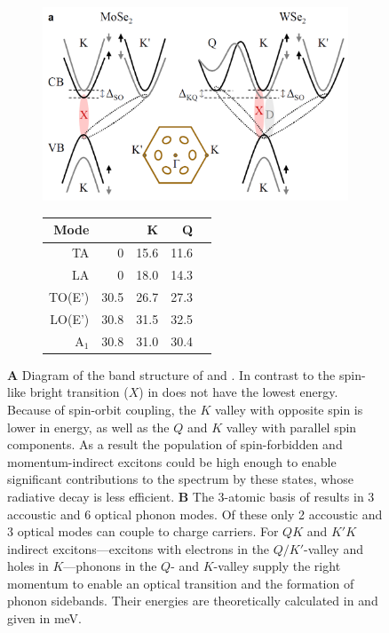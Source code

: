 \begin{figure}[t]
\centering
\begin{subfigure}{0.69\textwidth}
	\caption{}
	\includegraphics[width=.8\textwidth]{Band_structure_momentum_dark}
\end{subfigure}
\begin{subfigure}{0.3\textwidth}
	\caption{}
	\begin{tabular}{@{}rrrrr@{}}
	\toprule
	Mode&\Gamma&K&Q\\
	\midrule
	TA&0&15.6&11.6\\
	LA&0&18.0&14.3\\
	TO(E')&30.5&26.7&27.3\\
	LO(E')&30.8&31.5&32.5\\
	A$_1$&30.8&31.0&30.4\\
	\bottomrule
	\end{tabular}
\end{subfigure}
\caption{\textbf{A} Diagram of the band structure of \mose and \wse\! \cite{lindlau_identifying_2017}. In contrast to \mose the spin-like bright transition ($X$) in \wse does not have the lowest energy. Because of spin-orbit coupling, the $K$ valley with opposite spin is lower in energy, as well as the $Q$ and $K$ valley with parallel spin components. As a result the population of spin-forbidden and momentum-indirect excitons could be high enough to enable significant contributions to the \pl spectrum by these states, whose radiative decay is less efficient. \textbf{B} The 3-atomic basis of \tmds results in 3 accoustic and 6 optical phonon modes. Of these only 2 accoustic and 3 optical modes can couple to charge carriers. For $QK$ and $K'K$ indirect excitons---excitons with electrons in the $Q/K'$-valley and holes in $K$---phonons in the $Q$- and $K$-valley supply the right momentum to enable an optical transition and the formation of phonon sidebands. Their energies are theoretically calculated in  \cite{jin_intrinsic_2014} and given in meV. }\label{phonon_band}
\end{figure}

